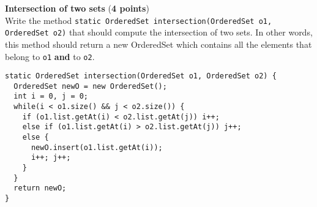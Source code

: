\documentclass[correction]{exercices}
\begin{document}
\begin{question} \textbf{Intersection of two sets} (\textbf{4 points}) \\
  Write the method
  \verb!static OrderedSet intersection(OrderedSet o1, OrderedSet o2)!
  that should compute the intersection of two sets. In other words, this
  method should return a new OrderedSet which contains all the elements
  that belong to \verb!o1! \textbf{and} to \verb!o2!.
\begin{correction}
\begin{verbatim}
static OrderedSet intersection(OrderedSet o1, OrderedSet o2) {
  OrderedSet newO = new OrderedSet();
  int i = 0, j = 0;
  while(i < o1.size() && j < o2.size()) {
    if (o1.list.getAt(i) < o2.list.getAt(j)) i++;
    else if (o1.list.getAt(i) > o2.list.getAt(j)) j++;
    else {
      newO.insert(o1.list.getAt(i));
      i++; j++;
    }
  }
  return newO;
}
\end{verbatim}
\end{correction}
\end{question}
\end{document}
